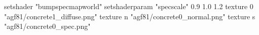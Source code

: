 setshader "bumpspecmapworld"
setshaderparam "specscale" 0.9 1.0 1.2
   texture 0 "agf81/concrete1_diffuse.png"
   texture n "agf81/concrete0_normal.png"
   texture s "agf81/concrete0_spec.png"